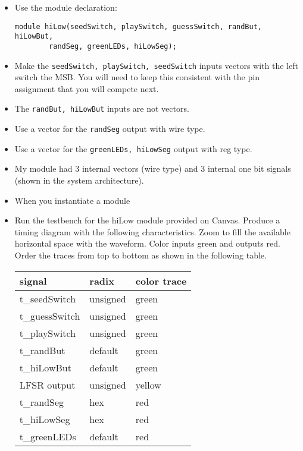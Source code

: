 \begin{itemize}
\item
  Use the module declaration:

\begin{verbatim}
module hiLow(seedSwitch, playSwitch, guessSwitch, randBut, hiLowBut,
		randSeg, greenLEDs, hiLowSeg); 
\end{verbatim}

\item
  Make the \verb+seedSwitch, playSwitch, seedSwitch+ inputs vectors with the
  left switch the MSB. You will need to keep this consistent with the
  pin assignment that you will compete next.
\item
  The \verb+randBut, hiLowBut+ inputs are not vectors.
\item
  Use a vector for the \verb+randSeg+ output with wire type.
\item
  Use a vector for the \verb+greenLEDs, hiLowSeg+ output with reg type.
\item
  My module had 3 internal vectors (wire type) and 3 internal one bit
  signals (shown in the system architecture).
\item
  When you instantiate a module
\item
  Run the testbench for the hiLow module provided on Canvas. Produce a
  timing diagram with the following characteristics. Zoom to fill the
  available horizontal space with the waveform. Color inputs green and
  outputs red. Order the traces from top to bottom as shown in the 
  \hypertarget{hlgg:signalColor}{following table}.

\begin{tabular}{p{4cm}p{4cm}p{4cm}}
signal & radix & color trace \\ \hline
    t\_seedSwitch & unsigned  & green  \\
    t\_guessSwitch & unsigned & green  \\
    t\_playSwitch & unsigned & green  \\
    t\_randBut & default & green  \\
    t\_hiLowBut & default & green  \\
    LFSR output & unsigned & yellow \\
    t\_randSeg & hex & red  \\
    t\_hiLowSeg & hex & red  \\
    t\_greenLEDs & default & red  \\
  \end{tabular}
\end{itemize}


